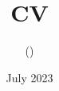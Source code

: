 \documentclass[]{cv}
\title{CV}
\author{\firstname \lastname \postnomial (\pronoun)}
\date{July 2023}
\begin{document}
\leantrue
\spacetrue

\end{document}
